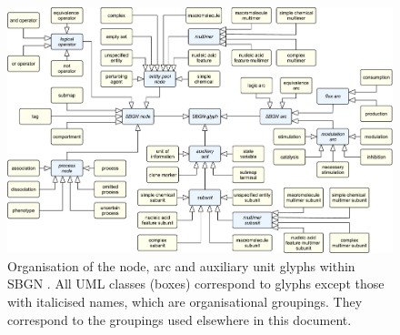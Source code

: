 \begin{figure}[htb]
\begin{center}
\includegraphics[width=\linewidth]{images/build/sbgn_glyph_model.pdf}
\caption{Organisation of the node, arc and auxiliary unit glyphs within SBGN \PDl. All UML classes (boxes) correspond to \PD glyphs except those with italicised names, which are organisational groupings. They correspond to the groupings used elsewhere in this document.}
\label{fig:sbgn_node_tax}
\end{center}
\end{figure}



